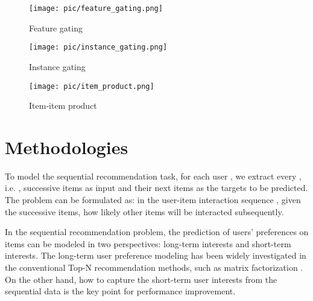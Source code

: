 \documentclass[sigconf]{acmart}
\begin{document}
\begin{figure*}[t!]
    \centering
    \begin{subfigure}[t]{0.33\textwidth}
        \centering
        \texttt{[image: pic/feature\_gating.png]}
        \caption{\label{fig:feature_gating}Feature gating}
    \end{subfigure}\begin{subfigure}[t]{0.33\textwidth}
        \centering
        \texttt{[image: pic/instance\_gating.png]}
        \caption{\label{fig:instance_gating}Instance gating}
    \end{subfigure}\begin{subfigure}[t]{0.33\textwidth}
        \centering
        \texttt{[image: pic/item\_product.png]}
        \caption{\label{fig:item_product}Item-item product}
    \end{subfigure}
    \caption{\label{fig:three_modules}An illustrative example of the feature gating, instance gating, and item-item product modules. In Figure \ref{fig:feature_gating}, the gray lines on items denote those latent features are masked off. In Figure \ref{fig:instance_gating}, the darker blue means the item is more important. In Figure \ref{fig:item_product}, the line linked between two items denotes the inner product, which captures the relations between the items users have accessed and the items users will access in the future.}
\end{figure*}


\section{Methodologies}
To model the sequential recommendation task, for each user , we extract every , i.e. , successive items as input and their next  items as the targets to be predicted. The problem can be formulated as: in the user-item interaction sequence , given the  successive items, how likely other  items will be interacted subsequently.

In the sequential recommendation problem, the prediction of users' preferences on items can be modeled in two perspectives: long-term interests and short-term interests. The long-term user preference modeling has been widely investigated in the conventional Top-N recommendation methods, such as matrix factorization \cite{DBLP:conf/icdm/HuKV08,DBLP:conf/uai/RendleFGS09}. On the other hand, how to capture the short-term user interests from the sequential data is the key point for performance improvement.
\end{document}
